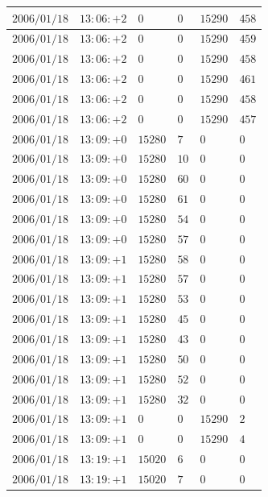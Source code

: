 \documentclass[a4j,papersize,disablejfam,slide,14pt]{jsarticle}
\begin{document}
\begin{description}
\begin{center}
\begin{longtable}{|l|l|l|l|l|l|}
					$2006/01/18$ & $13:06:+2$  & $0$ & $0$ & $15290$ & $458$ \\ \hline
					$2006/01/18$ & $13:06:+2$  & $0$ & $0$ & $15290$ & $459$ \\ \hline
					$2006/01/18$ & $13:06:+2$  & $0$ & $0$ & $15290$ & $458$ \\ \hline
					$2006/01/18$ & $13:06:+2$  & $0$ & $0$ & $15290$ & $461$ \\ \hline
					$2006/01/18$ & $13:06:+2$  & $0$ & $0$ & $15290$ & $458$ \\ \hline
					$2006/01/18$ & $13:06:+2$  & $0$ & $0$ & $15290$ & $457$ \\ \hline
					$2006/01/18$ & $13:09:+0$  & $15280$ & $7$ & $0$ & $0$ \\ \hline
					$2006/01/18$ & $13:09:+0$  & $15280$ & $10$ & $0$ & $0$ \\ \hline
					$2006/01/18$ & $13:09:+0$  & $15280$ & $60$ & $0$ & $0$ \\ \hline
					$2006/01/18$ & $13:09:+0$  & $15280$ & $61$ & $0$ & $0$ \\ \hline
					$2006/01/18$ & $13:09:+0$  & $15280$ & $54$ & $0$ & $0$ \\ \hline
					$2006/01/18$ & $13:09:+0$  & $15280$ & $57$ & $0$ & $0$ \\ \hline
					$2006/01/18$ & $13:09:+1$  & $15280$ & $58$ & $0$ & $0$ \\ \hline
					$2006/01/18$ & $13:09:+1$  & $15280$ & $57$ & $0$ & $0$ \\ \hline
					$2006/01/18$ & $13:09:+1$  & $15280$ & $53$ & $0$ & $0$ \\ \hline
					$2006/01/18$ & $13:09:+1$  & $15280$ & $45$ & $0$ & $0$ \\ \hline
					$2006/01/18$ & $13:09:+1$  & $15280$ & $43$ & $0$ & $0$ \\ \hline
					$2006/01/18$ & $13:09:+1$  & $15280$ & $50$ & $0$ & $0$ \\ \hline
					$2006/01/18$ & $13:09:+1$  & $15280$ & $52$ & $0$ & $0$ \\ \hline
					$2006/01/18$ & $13:09:+1$  & $15280$ & $32$ & $0$ & $0$ \\ \hline
					$2006/01/18$ & $13:09:+1$  & $0$ & $0$ & $15290$ & $2$ \\ \hline
					$2006/01/18$ & $13:09:+1$  & $0$ & $0$ & $15290$ & $4$ \\ \hline
					$2006/01/18$ & $13:19:+1$  & $15020$ & $6$ & $0$ & $0$ \\ \hline
					$2006/01/18$ & $13:19:+1$  & $15020$ & $7$ & $0$ & $0$ \\ \hline

\end{longtable}
\end{center}
\end{description}
\end{document}
